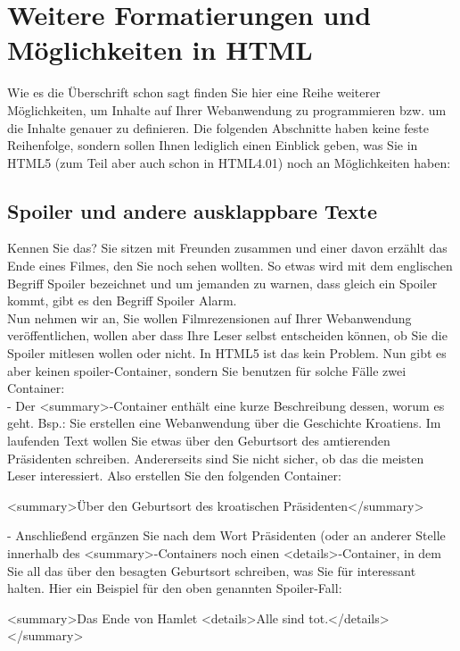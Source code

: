 \section{Weitere Formatierungen und Möglichkeiten in HTML}

Wie es die Überschrift schon sagt finden Sie hier eine Reihe weiterer Möglichkeiten, um Inhalte auf Ihrer Webanwendung zu programmieren bzw. um die Inhalte genauer zu definieren. Die folgenden Abschnitte haben keine feste Reihenfolge, sondern sollen Ihnen lediglich einen Einblick geben, was Sie in HTML5 (zum Teil aber auch schon in HTML4.01) noch an Möglichkeiten haben:

\subsection{Spoiler und andere ausklappbare Texte}

Kennen Sie das? Sie sitzen mit Freunden zusammen und einer davon erzählt das Ende eines Filmes, den Sie noch sehen wollten. So etwas wird mit dem englischen Begriff Spoiler bezeichnet und um jemanden zu warnen, dass gleich ein Spoiler kommt, gibt es den Begriff Spoiler Alarm.\\

Nun nehmen wir an, Sie wollen Filmrezensionen auf Ihrer Webanwendung veröffentlichen, wollen aber dass Ihre Leser selbst entscheiden können, ob Sie die Spoiler mitlesen wollen oder nicht. In HTML5 ist das kein Problem. Nun gibt es aber keinen spoiler-Container, sondern Sie benutzen für solche Fälle zwei Container:\\

-	Der <summary>-Container enthält eine kurze Beschreibung dessen, worum es geht. 
Bsp.: Sie erstellen eine Webanwendung über die Geschichte Kroatiens. Im laufenden Text wollen Sie etwas über den Geburtsort des amtierenden Präsidenten schreiben. Andererseits sind Sie nicht sicher, ob das die meisten Leser interessiert. Also erstellen Sie den folgenden Container:

<summary>Über den Geburtsort des kroatischen Präsidenten</summary>

-	Anschließend ergänzen Sie nach dem Wort Präsidenten (oder an anderer Stelle innerhalb des <summary>-Containers noch einen <details>-Container, in dem Sie all das über den besagten Geburtsort schreiben, was Sie für interessant halten.
Hier ein Beispiel für den oben genannten Spoiler-Fall:

<summary>Das Ende von Hamlet
<details>Alle sind tot.</details>
</summary>

